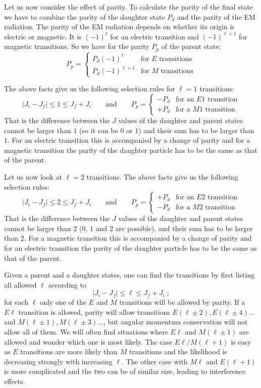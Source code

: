 \documentclass[12pt]{article}
\begin{document}
Let us now consider the effect of parity. To calculate the parity of the final state we have to combine the parity of the daughter state $P_d$ and the parity of the EM radiation. The parity of the EM radiation depends on whether its origin is electric or magnetic. It is $(-1)^\ell$ for an electric transition and $(-1)^{\ell+1}$ for magnetic transitions. So we have for the parity $P_p$ of the parent state:
\[P_p=\left\{\begin{array}{cc}
P_d(-1)^\ell&\mbox{for $E$ transitions}\\
P_d(-1)^{\ell+1}&\mbox{for $M$ transitions}
\end{array}\right.
\]

The above facts give us the following selection rules for $\ell=1$ transitions:
\[|J_i-J_f|\leq 1\leq J_f+J_i \qquad\mbox{and}\qquad P_p=\left\{\begin{array}{cc}
-P_d&\mbox{for an $E1$ transition}\\
+P_d&\mbox{for a $M1$ transition}\end{array}\right.\]
That is the difference between the $J$ values of the daughter and parent states cannot be larger than $1$ (so it can be $0$ or $1$) and their sum has to be larger than $1$. For an electric transition this is accompanied by a change of parity and for a magnetic transition the parity of the daughter particle has to be the same as that of the parent.

Let us now look at $\ell=2$ transitions. The above facts give us the following selection rules:
\[|J_i-J_f|\leq 2\leq J_f+J_i \qquad\mbox{and}\qquad P_p=\left\{\begin{array}{cc}
+P_d&\mbox{for an $E2$ transition}\\
-P_d&\mbox{for a $M2$ transition}\end{array}\right.\]
That is the difference between the $J$ values of the daughter and parent states cannot be larger than $2$ ($0$, $1$ and $2$ are possible), and their sum has to be larger than $2$. For a magnetic transition this is accompanied by a change of parity and for an electric transition the parity of the daughter particle has to be the same as that of the parent. 

Given a parent and a daughter states, one can find the transitions by first listing all allowed $\ell$ according to
\[|J_i-J_f|\leq \ell\leq J_f+J_i\;; \]
for each $\ell$ only one of the $E$ and $M$ transitions will be allowed by parity. If a $E\ell$ transition is allowed, parity will allow transitions $E(\ell\pm2),E(\ell\pm4)...$ and $M(\ell\pm1),M(\ell\pm3)...$, but angular momentum conservation will not allow all of them. We will often find situations where $E\ell$ and $M(\ell\pm1)$ are allowed and wonder which one is most likely. The case $E\ell/M(\ell+1)$ is easy as $E$ transitions are more likely than $M$ transitions and the likelihood is decreasing strongly with increasing $\ell$. The other case with $M\ell$ and $E(\ell+1)$ is more complicated and the two can be of similar size, leading to interference effects.  
\pagebreak
\end{document}
